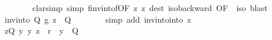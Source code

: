 \begin{isabellebody}
\ \ \ \ \ \ \isamarkupfalse%
\ {\isacharparenleft}{\kern0pt}clarsimp\ simp{\isacharcolon}{\kern0pt}\ f{\isacharunderscore}{\kern0pt}inv{\isacharunderscore}{\kern0pt}into{\isacharunderscore}{\kern0pt}f{\isacharbrackleft}{\kern0pt}OF\ z{\isacharbrackright}{\kern0pt}\ z\ dest{\isacharbang}{\kern0pt}{\isacharcolon}{\kern0pt}\ iso{\isacharunderscore}{\kern0pt}backward\ {\isacharbrackleft}{\kern0pt}OF\ {\isacharunderscore}{\kern0pt}\ iso{\isacharbrackright}{\kern0pt}{\isacharparenright}{\kern0pt}\ blast\isanewline
\ \ \ \ \isamarkupfalse%
\ \isamarkupfalse%
\ {\isachardoublequoteopen}inv{\isacharunderscore}{\kern0pt}into\ Q\ {\isacharquery}{\kern0pt}g\ z\ {\isasymin}\ Q{\isachardoublequoteclose}\isanewline
\ \ \ \ \ \ \isamarkupfalse%
\ {\isacharparenleft}{\kern0pt}simp\ add{\isacharcolon}{\kern0pt}\ inv{\isacharunderscore}{\kern0pt}into{\isacharunderscore}{\kern0pt}into\ z{\isacharparenright}{\kern0pt}\isanewline
\ \ \ \ \isamarkupfalse%
\ \isamarkupfalse%
\ {\isachardoublequoteopen}{\isasymexists}z{\isasymin}Q{\isachardot}{\kern0pt}\ {\isasymforall}y{\isachardot}{\kern0pt}\ {\isacharparenleft}{\kern0pt}y{\isacharcomma}{\kern0pt}\ z{\isacharparenright}{\kern0pt}\ {\isasymin}\ r{\isacharprime}{\kern0pt}\ {\isasymlongrightarrow}\ y\ {\isasymnotin}\ Q{\isachardoublequoteclose}\ \isacommand{{\isachardot}{\kern0pt}{\isachardot}{\kern0pt}}\isamarkupfalse%
\isanewline
\ \ \isamarkupfalse%
\isanewline
{}\isamarkupfalse%
%
\endisatagproof
{\isafoldproof}%
%
\isadelimproof
\isanewline
%
\endisadelimproof
%
\isadelimtheory
\isanewline
%
\endisadelimtheory
%
\isatagtheory
{}\isamarkupfalse%
%
\endisatagtheory
{\isafoldtheory}%
%
\isadelimtheory
%
\endisadelimtheory
%
\end{isabellebody}%
\endinput
